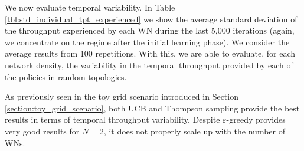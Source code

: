 \documentclass[10pt,journal,compsoc]{IEEEtran}
\begin{document}
	We now evaluate temporal variability. In Table \ref{tbl:std_individual_tpt_experienced} we show the average standard deviation of the throughput experienced by each WN during the last 5,000 iterations (again, we concentrate on the regime after the initial learning phase). We consider the average results from 100 repetitions. With this, we are able to evaluate, for each network density, the variability in the temporal throughput provided by each of the policies in random topologies.
	\begin{table}[h!]
		\centering
		\caption{Mean standard deviation of the throughput experienced $\Gamma_{i \in N}$ by each $WN_i$ during the last 5,000 iterations. 100 repetitions are considered for averaging purposes.}
		\label{tbl:std_individual_tpt_experienced}
	\end{table}	
	As previously seen in the toy grid scenario introduced in Section \ref{section:toy_grid_scenario}, both UCB and Thompson sampling provide the best results in terms of temporal throughput variability. Despite $\varepsilon$-greedy provides very good results for $N=2$, it does not properly scale up with the number of WNs.   
	
\end{document}
